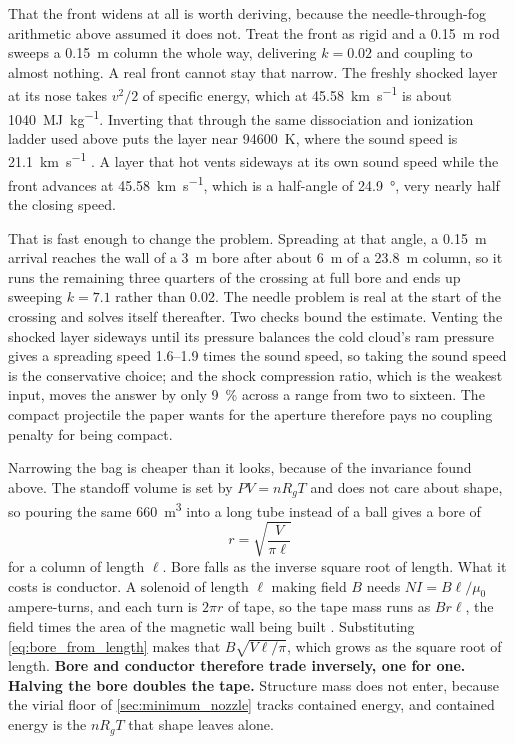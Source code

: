 \documentclass{article}
\begin{document}
That the front widens at all is worth deriving, because the needle-through-fog arithmetic above assumed it does not. Treat the front as rigid and a \SI{0.15}{\meter} rod sweeps a \SI{0.15}{\meter} column the whole way, delivering $k = 0.02$ and coupling to almost nothing. A real front cannot stay that narrow. The freshly shocked layer at its nose takes $v^2/2$ of specific energy, which at \SI{45.58}{\kilo\meter\per\second} is about \SI{1040}{\mega\joule\per\kilogram}. Inverting that through the same dissociation and ionization ladder used above puts the layer near \SI{94600}{\kelvin}, where the sound speed is \SI{21.1}{\kilo\meter\per\second} \cite{Katz_puffsat_impact_sim_2026}. A layer that hot vents sideways at its own sound speed while the front advances at \SI{45.58}{\kilo\meter\per\second}, which is a half-angle of \SI{24.9}{\degree}, very nearly half the closing speed.

That is fast enough to change the problem. Spreading at that angle, a \SI{0.15}{\meter} arrival reaches the wall of a \SI{3}{\meter} bore after about \SI{6}{\meter} of a \SI{23.8}{\meter} column, so it runs the remaining three quarters of the crossing at full bore and ends up sweeping $k = 7.1$ rather than 0.02. The needle problem is real at the start of the crossing and solves itself thereafter. Two checks bound the estimate. Venting the shocked layer sideways until its pressure balances the cold cloud's ram pressure gives a spreading speed \SIrange{1.6}{1.9}{} times the sound speed, so taking the sound speed is the conservative choice; and the shock compression ratio, which is the weakest input, moves the answer by only \SI{9}{\percent} across a range from two to sixteen. The compact projectile the paper wants for the aperture therefore pays no coupling penalty for being compact.

Narrowing the bag is cheaper than it looks, because of the invariance found above. The standoff volume is set by $PV = nR_gT$ and does not care about shape, so pouring the same \SI{660}{\cubic\meter} into a long tube instead of a ball gives a bore of
\begin{equation}\label{eq:bore_from_length}
r = \sqrt{\frac{V}{\pi \ell}}
\end{equation}
for a column of length $\ell$. Bore falls as the inverse square root of length. What it costs is conductor. A solenoid of length $\ell$ making field $B$ needs $NI = B\ell/\mu_0$ ampere-turns, and each turn is $2\pi r$ of tape, so the tape mass runs as $B r \ell$, the field times the area of the magnetic wall being built \cite{rebco_tapes}. Substituting \autoref{eq:bore_from_length} makes that $B\sqrt{V\ell/\pi}$, which grows as the square root of length. \textbf{Bore and conductor therefore trade inversely, one for one. Halving the bore doubles the tape.} Structure mass does not enter, because the virial floor of \autoref{sec:minimum_nozzle} tracks contained energy, and contained energy is the $nR_gT$ that shape leaves alone.
\end{document}
